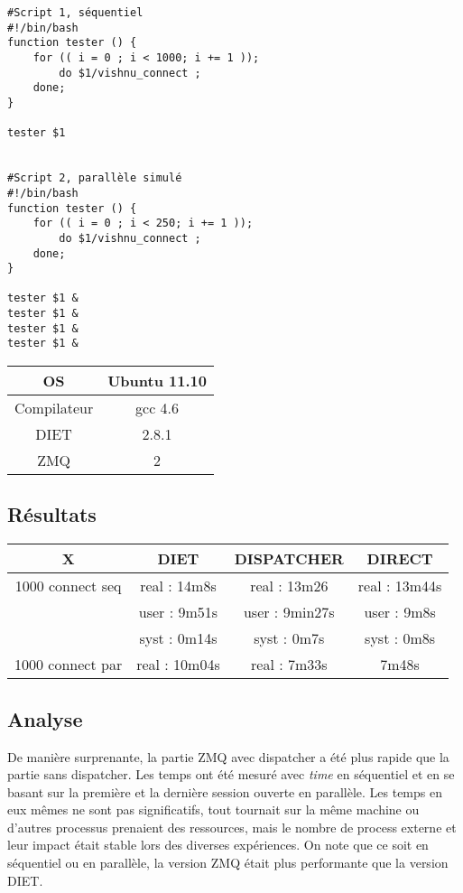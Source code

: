 \documentclass{article}
\begin{document}
\begin{verbatim}
#Script 1, séquentiel
#!/bin/bash
function tester () {
    for (( i = 0 ; i < 1000; i += 1 ));
        do $1/vishnu_connect ;
    done;
}

tester $1


#Script 2, parallèle simulé
#!/bin/bash
function tester () {
    for (( i = 0 ; i < 250; i += 1 ));
        do $1/vishnu_connect ;
    done;
}

tester $1 &
tester $1 &
tester $1 &
tester $1 &

\end{verbatim}

\begin{tabular}{|c|c|}
\hline
OS & Ubuntu 11.10 \\
\hline
Compilateur & gcc 4.6 \\
\hline
DIET & 2.8.1 \\
\hline
ZMQ & 2 \\
\hline
\end{tabular}

\subsection{R\'esultats}

\begin{tabular}{|c|c|c|c|}
\hline
 X & DIET & DISPATCHER & DIRECT \\
\hline
1000 connect seq & real : 14m8s & real : 13m26 & real : 13m44s \\
 & user : 9m51s & user : 9min27s & user : 9m8s \\
 & syst : 0m14s & syst : 0m7s & syst : 0m8s \\
\hline
1000 connect par & real : 10m04s & real : 7m33s & 7m48s \\
\hline
\end{tabular}

\subsection{Analyse}
De manière surprenante, la partie ZMQ avec dispatcher a été plus rapide que
 la partie sans dispatcher. Les temps ont été mesuré avec \textit{time} 
en séquentiel et en se basant sur la première et la dernière session 
ouverte en parallèle. Les temps en eux mêmes ne sont pas significatifs,
tout tournait sur la même machine ou d'autres processus prenaient des
ressources, mais le nombre de process externe et leur impact était stable
 lors des diverses expériences.
On note que ce soit en séquentiel ou en parallèle, la version ZMQ était plus performante que la version DIET.
\end{document}
